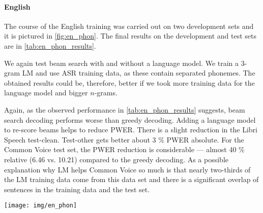 \paragraph{English}
The course of the English training was carried out on two development sets and it is pictured in \cref{fig:en_phon}. The final results on the development and test sets are in \cref{tab:en_phon_results}. 

We again test beam search with and without a language model. We train a 3-gram LM and use ASR training data, as these contain separated phonemes. The obtained results could be, therefore, better if we took more training data for the language model and bigger $n$-grams.

Again, as the observed performance in \cref{tab:en_phon_results} suggests, beam search decoding performs worse than greedy decoding. Adding a language model to re-score beams helps to reduce PWER. There is a slight reduction in the Libri Speech test-clean. Test-other gets better about 3 \% PWER absolute. For the Common Voice test set, the PWER reduction is considerable --- almost 40 \% relative (6.46 vs. 10.21) compared to the greedy decoding. As a possible explanation why LM helps Common Voice so much is that nearly two-thirds of the LM training data come from this data set and there is a significant overlap of sentences in the training data and the test set. 

\begin{figure*}[t]
	\texttt{[image: img/en\_phon]}
	\caption[Learning curves for English acoustic model]{Learning curves on phonemized Libri Speech \texttt{dev-clean} and Common Voice \texttt{dev}.}
	\label{fig:en_phon}
\end{figure*}

